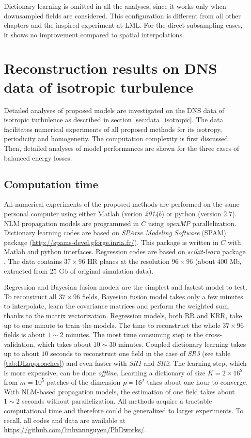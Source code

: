 Dictionary learning is omitted in all the analyses, since it works only when downsampled fields are considered. This configuration is different from all other chapters and the inspired experiment at LML. For the direct subsampling cases, it shows no improvement compared to spatial interpolations.


\section{Reconstruction results on DNS data of isotropic turbulence}
\label{sec:comparisons_isotropic}
Detailed analyses of proposed models are investigated on the DNS data of isotropic turbulence as described in section \ref{sec:data_isotropic}. The data facilitates numerical experiments of all proposed methods for its isotropy, periodicity and homogeneity. The computation complexity is first discussed. Then, detailed analyses of model performances are shown for the three cases of balanced energy losses. 

\subsection*{Computation time}
All numerical experiments of the proposed methods are performed on the same personal computer using either Matlab (verion \textit{2014b}) or python (version $ 2.7 $). NLM propagation models are programmed in $ C $ using \textit{openMP} parallelization. Dictionary learning codes are based on \textit{SPArse Modeling Software} (SPAM) package (\url{http://spams-devel.gforge.inria.fr/}). This package is written in $ C $ with Matlab and python interfaces. Regression codes are based on \textit{scikit-learn} package \citep{scikit-learn}. The data contains $ 37 \times 96 $ HR planes at the resolution $ 96 \times 96 $ (about $ 400 $ Mb, extracted from $ 25 $ Gb of original simulation data).

Regression and Bayesian fusion models are the simplest and fastest model to test. To reconstruct all $ 37 \times 96 $ fields, Bayesian fusion model takes only a few minutes to interpolate, learn the covariance matrices and perform the weighted sum, thanks to the matrix vectorization. Regression models, both RR and KRR, take up to one minute to train the models. The time to reconstruct the whole $ 37 \times 96  $ fields is about $ 1 \sim 2 $ minutes. The most time consuming step is the cross-validation, which takes about $ 10 \sim 30 $ minutes. Coupled dictionary learning takes up to about $ 10 $ seconds to reconstruct one field in the case of \textit{SR3} (see table \ref{tab:DLapproaches}) and even faster with \textit{SR1} and \textit{SR2}. The learning step, which is more expensive, can be done \textit{offline}. Learning a dictionary of size $ K = 2 \times 16^2 $ from $ m=10^5 $ patches of the dimension $ p = 16^2 $ takes about one hour to converge. With NLM-based propagation models, the estimation of one field takes about $ 1 \sim 2 $ seconds without parallelization. All methods acquire a tractable computational time and therefore could be generalized to larger experiments. To recall, all codes and data are available at \url{https://github.com/linhvannguyen/PhDworks/}.


